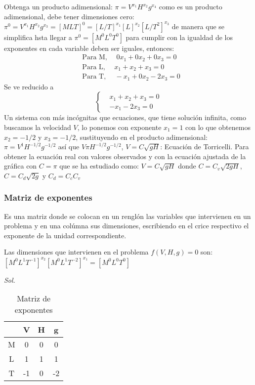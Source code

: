 Obtenga un producto adimensional: $\pi=V^{x_1}H^{x_2}g^{x_4}$ como es un producto adimensional, debe tener dimensiones cero: $\pi^0=V^{x_1}H^{x_2}g^{x_3}=\left[MLT\right]^0=\left[L/T\right]^{x_1}\left[L\right]^{x_2}\left[L/T^2\right]^{x_3}$ de manera que se simplifica hsta llegar a $\pi^0=\left[M^0L^0T^0\right]$ para cumplir con la igualdad de los exponentes en cada variable deben ser iguales, entonces: 
\begin{align*}
    &\text{Para M, }\quad 0x_1+ 0x_2+ 0x_3 =0\\
    &\text{Para L, }\quad x_1+ x_2+ x_3 = 0\\
    &\text{Para T, }\quad -x_1+ 0x_2 - 2x_3 =0
\end{align*}
Se ve reducido a
\begin{equation*}
    \begin{cases}
        &x_1 +x_2 + x_3= 0\\
        &- x_1 - 2x_3= 0
    \end{cases}
\end{equation*}
Un sistema con más incógnitas que ecuaciones, que tiene solución infinita, como buscamos la velocidad $V$, lo ponemos con exponente $x_1=1$ con lo que obtenemos $x_2=-1/2$ y $x_3=-1/2$, sustituyendo en el producto adimensional: $\pi=V^1H^{-1/2}g^{-1/2}$ así que $V\pi H^{-1/2}g^{-1/2}$, $V=C \sqrt{gH}$: Ecuación de Torricelli. Para obtener la ecuación real con valores observados y con la ecuación ajustada de la gráfica con $C=\pi$ que se ha estudiado como: $V=C \sqrt{gH}$ donde $C=C_v \sqrt{2gH}$, $C=C_d\sqrt{2g}$ y $C_d=C_cC_v$

\subsubsection{Matriz de exponentes}
Es una matriz donde se colocan en un renglón las variables que intervienen en un problema y en una colúmna sus dimensiones, escribiendo en el crice respectivo el exponente de la unidad correspondiente.
\begin{example}
    Las dimensiones que intervienen en el problema $f(V,H,g)=0$ son: $\left[M^0L^1T^{-1}\right]^{x_2}\left[M^0L^1T^{-2}\right]^{x_1}=\left[M^0L^0T^0\right]$
\end{example}
\textit{ Sol. }
\begin{table}[h!]
    \centering
    \begin{tabular}{@{}cccc@{}}
    \toprule
      & V  & H & g  \\ \midrule
    M & 0  & 0 & 0  \\
    L & 1  & 1 & 1  \\
    T & -1 & 0 & -2 \\ \bottomrule
    \end{tabular}
    \caption{Matriz de exponentes}
    \label{tabha1}
\end{table}

